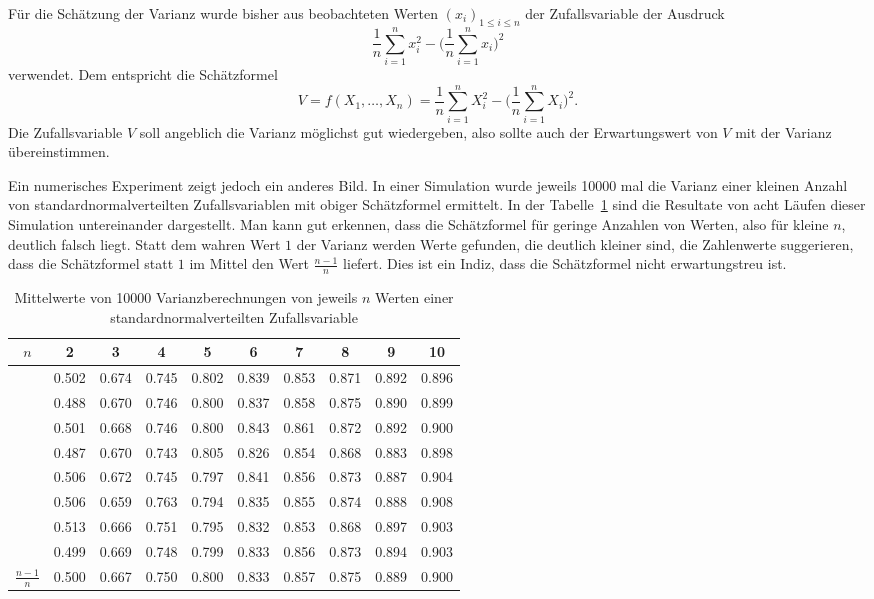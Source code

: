 Für die Schätzung der Varianz wurde bisher aus beobachteten Werten
$(x_i)_{1\le i\le n}$ der Zufallsvariable der Ausdruck
\begin{equation}
\frac1n\sum_{i=1}^n x_i^2-\biggl(\frac1n\sum_{i=1}^nx_i\biggr)^2
\end{equation}
verwendet.
Dem entspricht die Schätzformel
\begin{equation}
V=f(X_1,\dots,X_n)=\frac1n\sum_{i=1}^nX_i^2-\biggl(\frac1n\sum_{i=1}^nX_i\biggr)^2.
\label{schaetzer-sstern}
\end{equation}
Die Zufallsvariable $V$ soll angeblich die Varianz möglichst gut
wiedergeben, also sollte auch der Erwartungswert von $V$ mit der Varianz
übereinstimmen.

Ein numerisches Experiment zeigt jedoch ein anderes Bild.
In einer
Simulation wurde jeweils 10000 mal die Varianz einer kleinen Anzahl von
standardnormalverteilten Zufallsvariablen mit obiger Schätzformel ermittelt.
In der Tabelle~\ref{varianzschaetzung} sind die Resultate von acht
Läufen dieser Simulation untereinander dargestellt.
Man kann gut erkennen, 
dass die Schätzformel für geringe Anzahlen von Werten, also für kleine
$n$, deutlich falsch liegt.
Statt dem wahren Wert $1$ der Varianz
werden Werte gefunden, die deutlich kleiner sind, die Zahlenwerte
suggerieren, dass die Schätzformel statt $1$ im Mittel den Wert
$\frac{n-1}n$ liefert.
Dies ist ein Indiz, dass die Schätzformel nicht
erwartungstreu ist.

\begin{table}
\begin{center}
\begin{tabular}{|c|ccccccccc|}
\hline
$n$&2&3&4&5&6&7&8&9&10\\
\hline
&0.502&0.674&0.745&0.802&0.839&0.853&0.871&0.892&0.896\\
&0.488&0.670&0.746&0.800&0.837&0.858&0.875&0.890&0.899\\
&0.501&0.668&0.746&0.800&0.843&0.861&0.872&0.892&0.900\\
&0.487&0.670&0.743&0.805&0.826&0.854&0.868&0.883&0.898\\
&0.506&0.672&0.745&0.797&0.841&0.856&0.873&0.887&0.904\\
&0.506&0.659&0.763&0.794&0.835&0.855&0.874&0.888&0.908\\
&0.513&0.666&0.751&0.795&0.832&0.853&0.868&0.897&0.903\\
&0.499&0.669&0.748&0.799&0.833&0.856&0.873&0.894&0.903\\
\hline
$\frac{n-1}{n}$&0.500&0.667&0.750&0.800&0.833&0.857&0.875&0.889&0.900\\
\hline
\end{tabular}
\end{center}
\caption{Mittelwerte von 10000 Varianzberechnungen von jeweils $n$
Werten einer standardnormalverteilten Zufallsvariable\label{varianzschaetzung}}
\end{table}

